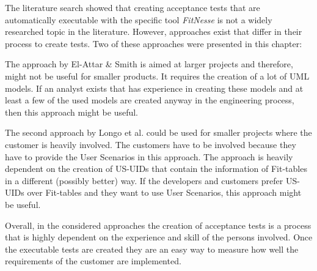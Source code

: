 The literature search showed that creating acceptance tests that are automatically executable with the specific tool \textit{FitNesse} is not a widely researched topic in the literature.
However, approaches exist that differ in their process to create tests.
Two of these approaches were presented in this chapter:

The approach by El-Attar \& Smith is aimed at larger projects and therefore, might not be useful for smaller products.
It requires the creation of a lot of UML models.
If an analyst exists that has experience in creating these models and at least a few of the used models are created anyway in the engineering process, then this approach might be useful.

The second approach by Longo et al. could be used for smaller projects where the customer is heavily involved.
The customers have to be involved because they have to provide the User Scenarios in this approach.
The approach is heavily dependent on the creation of US-UIDs that contain the information of Fit-tables in a different (possibly better) way.
If the developers and customers prefer US-UIDs over Fit-tables and they want to use User Scenarios, this approach might be useful.

Overall, in the considered approaches the creation of acceptance tests is a process that is highly dependent on the experience and skill of the persons involved.
Once the executable tests are created they are an easy way to measure how well the requirements of the customer are implemented.

